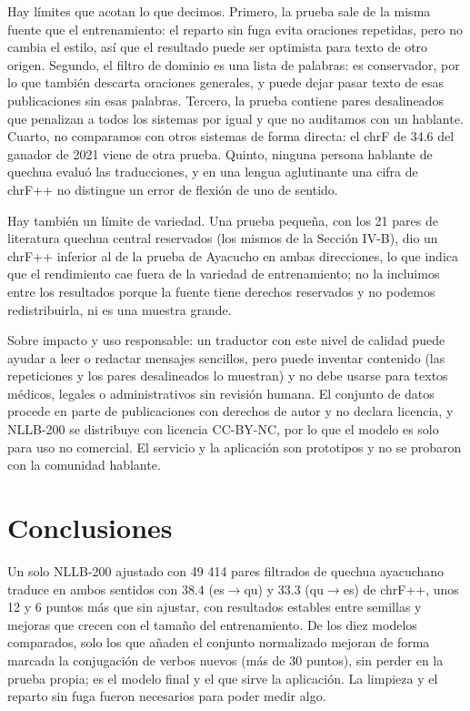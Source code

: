 \documentclass[conference]{IEEEtran}
\begin{document}
Hay límites que acotan lo que decimos. Primero, la prueba sale de la misma fuente que el entrenamiento: el reparto sin fuga evita oraciones repetidas, pero no cambia el estilo, así que el resultado puede ser optimista para texto de otro origen. Segundo, el filtro de dominio es una lista de palabras: es conservador, por lo que también descarta oraciones generales, y puede dejar pasar texto de esas publicaciones sin esas palabras. Tercero, la prueba contiene pares desalineados que penalizan a todos los sistemas por igual y que no auditamos con un hablante. Cuarto, no comparamos con otros sistemas de forma directa: el chrF de 34.6 del ganador de 2021 \cite{r3,r4} viene de otra prueba. Quinto, ninguna persona hablante de quechua evaluó las traducciones, y en una lengua aglutinante una cifra de chrF++ no distingue un error de flexión de uno de sentido.

Hay también un límite de variedad. Una prueba pequeña, con los 21 pares de literatura quechua central reservados (los mismos de la Sección IV-B), dio un chrF++ inferior al de la prueba de Ayacucho en ambas direcciones, lo que indica que el rendimiento cae fuera de la variedad de entrenamiento; no la incluimos entre los resultados porque la fuente tiene derechos reservados y no podemos redistribuirla, ni es una muestra grande.

Sobre impacto y uso responsable: un traductor con este nivel de calidad puede ayudar a leer o redactar mensajes sencillos, pero puede inventar contenido (las repeticiones y los pares desalineados lo muestran) y no debe usarse para textos médicos, legales o administrativos sin revisión humana. El conjunto de datos procede en parte de publicaciones con derechos de autor y no declara licencia, y NLLB-200 se distribuye con licencia CC-BY-NC, por lo que el modelo es solo para uso no comercial. El servicio y la aplicación son prototipos y no se probaron con la comunidad hablante.

\section{Conclusiones}
Un solo NLLB-200 ajustado con 49 414 pares filtrados de quechua ayacuchano traduce en ambos sentidos con 38.4 (es$\rightarrow$qu) y 33.3 (qu$\rightarrow$es) de chrF++, unos 12 y 6 puntos más que sin ajustar, con resultados estables entre semillas y mejoras que crecen con el tamaño del entrenamiento. De los diez modelos comparados, solo los que añaden el conjunto normalizado mejoran de forma marcada la conjugación de verbos nuevos (más de 30 puntos), sin perder en la prueba propia; es el modelo final y el que sirve la aplicación. La limpieza y el reparto sin fuga fueron necesarios para poder medir algo.
\end{document}
